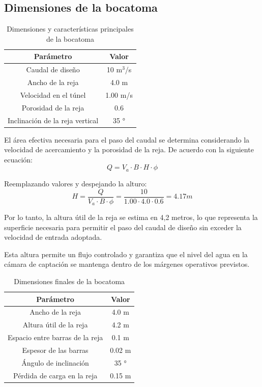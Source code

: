 \documentclass{article} %
\begin{document}
\subsection{Dimensiones de la bocatoma}
\begin{table}
    \centering
    \begin{tabular}{c c}
        \textbf{Parámetro} & \textbf{Valor} \\
        \hline
        Caudal de diseño & 10 m$^3$/s \\ 
        Ancho de la reja & 4.0 m \\
        Velocidad en el túnel & 1.00 m/s \\
        Porosidad de la reja & 0.6 \\
        Inclinación de la reja vertical & 35 ° \\ \hline
    \end{tabular}
    \caption{Dimensiones y características principales de la bocatoma}
\end{table}

El área efectiva necesaria para el paso del caudal se determina considerando la velocidad de acercamiento y la porosidad de la reja.
De acuerdo con la siguiente ecuación:
\begin{equation}
    Q = V_a \cdot B \cdot H \cdot \phi
\end{equation}

Reemplazando valores y despejando la alturo:
\begin{equation}
    H = \frac{Q}{V_a \cdot B \cdot \phi} = \frac{10}{1.00 \cdot 4.0 \cdot 0.6} = 4.17 m
\end{equation}

Por lo tanto, la altura útil de la reja se estima en 4,2 metros, lo que representa la superficie necesaria para permitir el paso del caudal de diseño sin exceder la velocidad de entrada adoptada.

Esta altura permite un flujo controlado y garantiza que el nivel del agua en la cámara de captación se mantenga dentro de los márgenes operativos previstos.

\begin{table}
    \centering
    \begin{tabular}{c c}
        \textbf{Parámetro} & \textbf{Valor} \\
        \hline
        Ancho de la reja & 4.0 m \\
        Altura útil de la reja & 4.2 m \\ 
        Espacio entre barras de la reja & 0.1 m \\
        Espesor de las barras & 0.02 m \\
        Ángulo de inclinación & 35 ° \\
        Pérdida de carga en la reja & 0.15 m \\ \hline
    \end{tabular}
    \caption{Dimensiones finales de la bocatoma}
\end{table}
\end{document}
